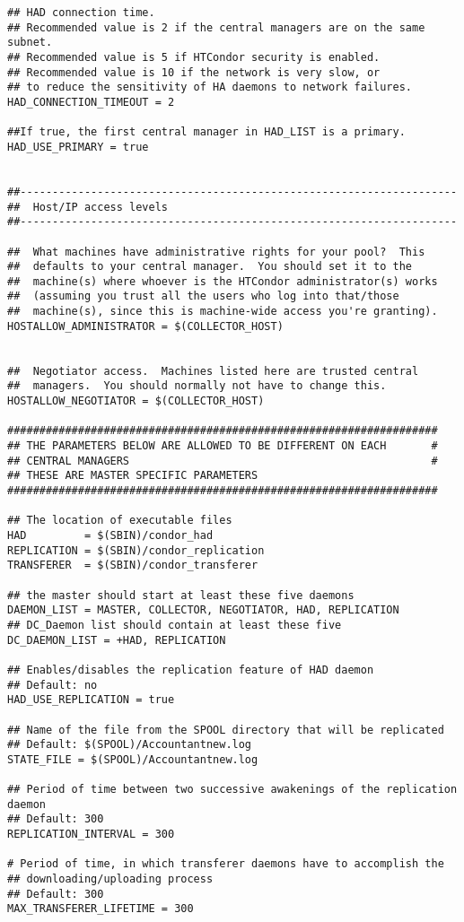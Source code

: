 \begin{verbatim}
## HAD connection time.
## Recommended value is 2 if the central managers are on the same subnet.
## Recommended value is 5 if HTCondor security is enabled.
## Recommended value is 10 if the network is very slow, or
## to reduce the sensitivity of HA daemons to network failures.
HAD_CONNECTION_TIMEOUT = 2

##If true, the first central manager in HAD_LIST is a primary.
HAD_USE_PRIMARY = true


##--------------------------------------------------------------------
##  Host/IP access levels
##--------------------------------------------------------------------

##  What machines have administrative rights for your pool?  This
##  defaults to your central manager.  You should set it to the
##  machine(s) where whoever is the HTCondor administrator(s) works
##  (assuming you trust all the users who log into that/those
##  machine(s), since this is machine-wide access you're granting).
HOSTALLOW_ADMINISTRATOR = $(COLLECTOR_HOST) 


##  Negotiator access.  Machines listed here are trusted central
##  managers.  You should normally not have to change this.
HOSTALLOW_NEGOTIATOR = $(COLLECTOR_HOST)

###################################################################
## THE PARAMETERS BELOW ARE ALLOWED TO BE DIFFERENT ON EACH       #
## CENTRAL MANAGERS                                               #
## THESE ARE MASTER SPECIFIC PARAMETERS
###################################################################

## The location of executable files
HAD         = $(SBIN)/condor_had
REPLICATION = $(SBIN)/condor_replication
TRANSFERER  = $(SBIN)/condor_transferer

## the master should start at least these five daemons
DAEMON_LIST = MASTER, COLLECTOR, NEGOTIATOR, HAD, REPLICATION
## DC_Daemon list should contain at least these five
DC_DAEMON_LIST = +HAD, REPLICATION

## Enables/disables the replication feature of HAD daemon
## Default: no
HAD_USE_REPLICATION = true

## Name of the file from the SPOOL directory that will be replicated
## Default: $(SPOOL)/Accountantnew.log
STATE_FILE = $(SPOOL)/Accountantnew.log

## Period of time between two successive awakenings of the replication daemon
## Default: 300
REPLICATION_INTERVAL = 300

# Period of time, in which transferer daemons have to accomplish the 
## downloading/uploading process
## Default: 300
MAX_TRANSFERER_LIFETIME = 300


\end{verbatim}
